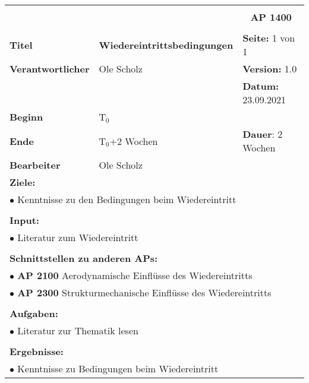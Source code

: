 \clearpage
\begin{table}[!h]
	\begin{center}
		\begin{tabular}{|p{35mm}||p{55mm}|p{50mm}||p{40mm}|}
			\hline
			\multicolumn{3}{|l||}{\textbf{}} & \multicolumn{1}{c|}{}\\
			\multicolumn{3}{|l||}{\textbf{}} & \multicolumn{1}{c|}{\textbf{AP 1400}}\\
			\multicolumn{3}{|l||}{\textbf{}} & \multicolumn{1}{c|}{}\\
			\hline\hline
			\textbf{Titel} & \multicolumn{2}{p{7cm}||}{\textbf{Wiedereintrittsbedingungen}} 
			& \textbf{Seite:} 1 von 1\\
			\hline
			\textbf{Verantwortlicher} & \multicolumn{2}{l||}{Ole Scholz} & \textbf{Version:} 1.0\\
			\hline
			\multicolumn{3}{|l||}{} & \textbf{Datum:} 23.09.2021\\
			\hline\hline
			\textbf{Beginn} & \multicolumn{2}{l||}{T$_0$} & \\
			\hline
			\textbf{Ende} & \multicolumn{2}{l||}{T$_0$+2 Wochen} & \textbf{Dauer}: 2 Wochen\\
			\hline\hline
			\textbf{Bearbeiter} & \multicolumn{3}{l|}{Ole Scholz}\\
			\hline\hline
			\multicolumn{4}{|p{150mm}|}{\textbf{Ziele:}}\\
			\multicolumn{4}{|p{150mm}|}{$\bullet$ Kenntnisse zu den Bedingungen beim Wiedereintritt}\\
			\multicolumn{4}{|p{150mm}|}{}\\
			\multicolumn{4}{|p{150mm}|}{\textbf{Input:}}\\
			\multicolumn{4}{|p{150mm}|}{$\bullet$ Literatur zum Wiedereintritt}\\
			\multicolumn{4}{|p{150mm}|}{}\\
			\multicolumn{4}{|p{150mm}|}{\textbf{Schnittstellen zu anderen APs:}}\\
			\multicolumn{4}{|p{150mm}|}{$\bullet$ \textbf{AP 2100} Aerodynamische Einflüsse des Wiedereintritts}\\
			\multicolumn{4}{|p{150mm}|}{$\bullet$ \textbf{AP 2300} Strukturmechanische Einflüsse des Wiedereintritts}\\
			\multicolumn{4}{|p{150mm}|}{}\\
			\multicolumn{4}{|p{150mm}|}{\textbf{Aufgaben:}}\\
			\multicolumn{4}{|p{150mm}|}{$\bullet$ Literatur zur Thematik lesen}\\
			\multicolumn{4}{|p{150mm}|}{}\\
			\multicolumn{4}{|p{150mm}|}{\textbf{Ergebnisse:}}\\
			\multicolumn{4}{|p{150mm}|}{$\bullet$ Kenntnisse zu Bedingungen beim Wiedereintritt}\\
			\hline
		\end{tabular}
	\end{center}
\end{table}
	
